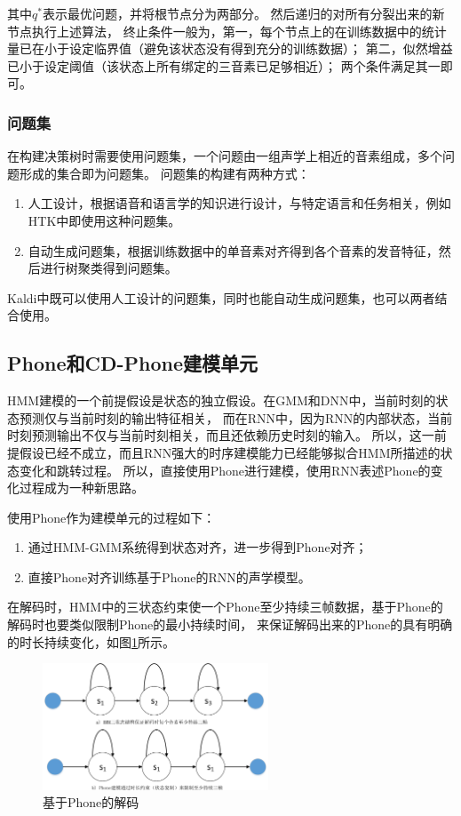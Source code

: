 其中$q^*$表示最优问题，并将根节点分为两部分。
然后递归的对所有分裂出来的新节点执行上述算法，
终止条件一般为，第一，每个节点上的在训练数据中的统计量已在小于设定临界值（避免该状态没有得到充分的训练数据）；
第二，似然增益已小于设定阈值（该状态上所有绑定的三音素已足够相近）； 两个条件满足其一即可。

\subsubsection{问题集}

在构建决策树时需要使用问题集，一个问题由一组声学上相近的音素组成，多个问题形成的集合即为问题集。
问题集的构建有两种方式：
\begin{enumerate}
\item 人工设计，根据语音和语言学的知识进行设计，与特定语言和任务相关，例如HTK中即使用这种问题集。
\item 自动生成问题集，根据训练数据中的单音素对齐得到各个音素的发音特征，然后进行树聚类得到问题集。
\end{enumerate}
Kaldi中既可以使用人工设计的问题集，同时也能自动生成问题集，也可以两者结合使用。

\subsection{Phone和CD-Phone建模单元}

HMM建模的一个前提假设是状态的独立假设。在GMM和DNN中，当前时刻的状态预测仅与当前时刻的输出特征相关，
而在RNN中，因为RNN的内部状态，当前时刻预测输出不仅与当前时刻相关，而且还依赖历史时刻的输入。
所以，这一前提假设已经不成立，而且RNN强大的时序建模能力已经能够拟合HMM所描述的状态变化和跳转过程。
所以，直接使用Phone进行建模，使用RNN表述Phone的变化过程成为一种新思路。

使用Phone作为建模单元的过程如下：
\begin{enumerate}
\item 通过HMM-GMM系统得到状态对齐，进一步得到Phone对齐；
\item 直接Phone对齐训练基于Phone的RNN的声学模型。
\end{enumerate}
在解码时，HMM中的三状态约束使一个Phone至少持续三帧数据，基于Phone的解码时也要类似限制Phone的最小持续时间，
来保证解码出来的Phone的具有明确的时长持续变化，如图\ref{fig:duration}所示。

\begin{figure}
\centering
\includegraphics[width=0.6\textwidth]{figures/chapter4/duration-crop}
\caption{基于Phone的解码}
\label{fig:duration}
\end{figure}

